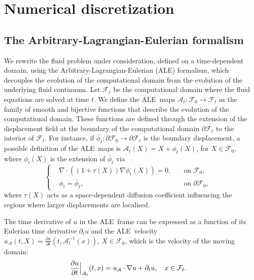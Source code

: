 \documentclass[graybox]{svmult}
\newcommand{\Fluid}{\mathcal{F}} %
\newcommand{\Alemap}{\mathcal{A}} %
\newcommand{\ALE}{ALE} %
\newcommand{\Vel}{u} %
\newcommand{\CompDomain}{\Fluid}
\begin{document}
\section{Numerical discretization}
\label{Sec:NumDiscr}

\subsection{The Arbitrary-Lagrangian-Eulerian formalism}
We rewrite the fluid problem under consideration, defined on a time-dependent domain, using the Arbitrary-Lagrangian-Eulerian (\ALE) formalism, which decouples the evolution of the computational domain from the evolution of the underlying fluid continuum. 
Let $\CompDomain_t$ be the computational domain where the fluid equations are solved at time $t$. We define the \ALE\ maps $\Alemap_t:\CompDomain_0 \to \CompDomain_t$ as the family of smooth and bijective functions that describe the evolution of the computational domain. These functions are defined through the extension of the displacement field at the boundary of the computational domain $\partial \CompDomain_t$ to the interior of $\CompDomain_t$. For instance, if $\bar{\phi}_t:\partial \CompDomain_0 \to \partial \CompDomain_t$ is the boundary displacement, a possible definition of the \ALE\ maps is $\Alemap_t(X) = X + \phi_t(X)$, for $X \in \CompDomain_0$, where $\phi_t(X)$ is the extension of $\bar{\phi}_t$ via
\begin{equation}
	\left\{
	\begin{aligned}
		&\nabla \cdot((1+\tau(X))\nabla \phi_t(X)) = 0, \quad &\text{on $\CompDomain_0$},\\
		&\mathcal{\phi}_t= \bar{\phi}_t, &\text{on $\partial \CompDomain_0$},
	\end{aligned}
	\right.
 \label{Eq: VarFormALE}
\end{equation}
where $\tau(X)$ acts as a space-dependent diffusion coefficient influencing the regions where larger displacements are localised.

The time derivative of $\Vel$ in the \ALE\ frame can be expressed as a function of its Eulerian time derivative $\partial_t \Vel$ and the \ALE\ velocity $\Vel_{\mathcal{A}}(t,X)=\frac{\partial x}{\partial t}(t,\Alemap_t^{-1}(x))$, $X \in \CompDomain_0$, which is the velocity of the moving domain:
\begin{equation}
\frac{\partial \Vel}{\partial t} \Big|_{\Alemap_t}(t,x)=\Vel_{\mathcal{A}} \cdot \nabla \Vel + \partial_t \Vel, \quad \text{$ x \in \CompDomain_t$}.
\end{equation}
\end{document}
